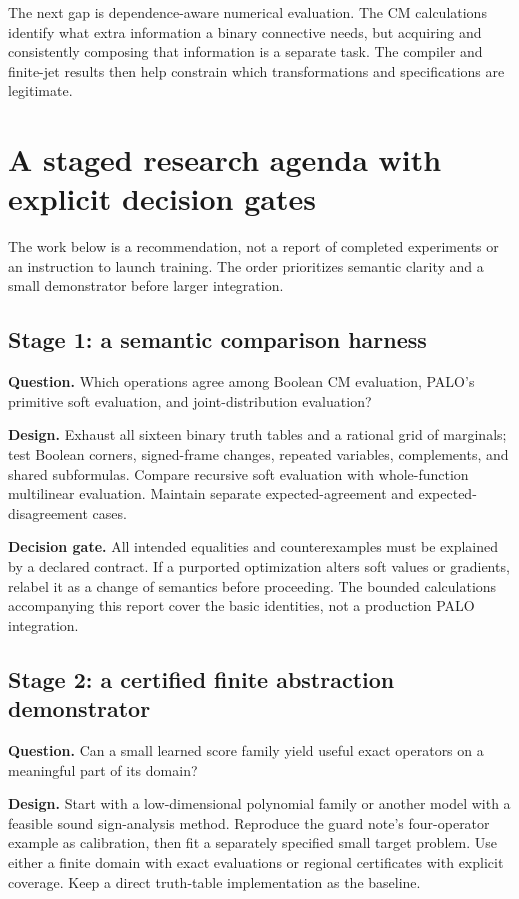 \documentclass[11pt,a4paper]{article}
\theoremstyle{remark}
\begin{document}
The next gap is dependence-aware numerical evaluation. The CM calculations identify what extra information a binary connective needs, but acquiring and consistently composing that information is a separate task. The compiler and finite-jet results then help constrain which transformations and specifications are legitimate.

\section{A staged research agenda with explicit decision gates}
The work below is a recommendation, not a report of completed experiments or an instruction to launch training. The order prioritizes semantic clarity and a small demonstrator before larger integration.

\subsection{Stage 1: a semantic comparison harness}
\textbf{Question.} Which operations agree among Boolean CM evaluation, PALO's primitive soft evaluation, and joint-distribution evaluation?

\textbf{Design.} Exhaust all sixteen binary truth tables and a rational grid of marginals; test Boolean corners, signed-frame changes, repeated variables, complements, and shared subformulas. Compare recursive soft evaluation with whole-function multilinear evaluation. Maintain separate expected-agreement and expected-disagreement cases.

\textbf{Decision gate.} All intended equalities and counterexamples must be explained by a declared contract. If a purported optimization alters soft values or gradients, relabel it as a change of semantics before proceeding. The bounded calculations accompanying this report cover the basic identities, not a production PALO integration.

\subsection{Stage 2: a certified finite abstraction demonstrator}
\textbf{Question.} Can a small learned score family yield useful exact operators on a meaningful part of its domain?

\textbf{Design.} Start with a low-dimensional polynomial family or another model with a feasible sound sign-analysis method. Reproduce the guard note's four-operator example as calibration, then fit a separately specified small target problem. Use either a finite domain with exact evaluations or regional certificates with explicit coverage. Keep a direct truth-table implementation as the baseline.
\end{document}
